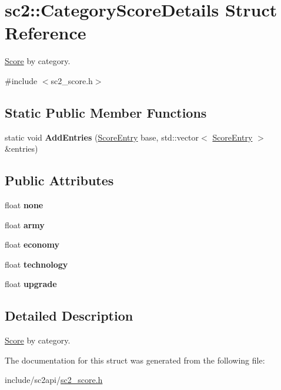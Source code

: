 \hypertarget{structsc2_1_1_category_score_details}{}\section{sc2\+:\+:Category\+Score\+Details Struct Reference}
\label{structsc2_1_1_category_score_details}


\hyperlink{structsc2_1_1_score}{Score} by category.  




{\ttfamily \#include $<$sc2\+\_\+score.\+h$>$}

\subsection*{Static Public Member Functions}
\begin{DoxyCompactItemize}
\item 
\mbox{\label{structsc2_1_1_category_score_details_a6afc040055f78a22b24dd0e73e9f5c7f}} 
static void {\bfseries Add\+Entries} (\hyperlink{structsc2_1_1_score_entry}{Score\+Entry} base, std\+::vector$<$ \hyperlink{structsc2_1_1_score_entry}{Score\+Entry} $>$ \&entries)
\end{DoxyCompactItemize}
\subsection*{Public Attributes}
\begin{DoxyCompactItemize}
\item 
\mbox{\label{structsc2_1_1_category_score_details_ab9b21836c95766c6b4a7bf5252af1d96}} 
float {\bfseries none}
\item 
\mbox{\label{structsc2_1_1_category_score_details_ab6bfbc156755543869c8fe3752be74d3}} 
float {\bfseries army}
\item 
\mbox{\label{structsc2_1_1_category_score_details_a91b3b9494c31de0d080e7e71d1af9201}} 
float {\bfseries economy}
\item 
\mbox{\label{structsc2_1_1_category_score_details_aa26c67bfad47a0070a84b3be1b1fb0e5}} 
float {\bfseries technology}
\item 
\mbox{\label{structsc2_1_1_category_score_details_a2472de45854b42861e0c92b3bbd5f731}} 
float {\bfseries upgrade}
\end{DoxyCompactItemize}


\subsection{Detailed Description}
\hyperlink{structsc2_1_1_score}{Score} by category. 

The documentation for this struct was generated from the following file\+:\begin{DoxyCompactItemize}
\item 
include/sc2api/\hyperlink{sc2__score_8h}{sc2\+\_\+score.\+h}\end{DoxyCompactItemize}
